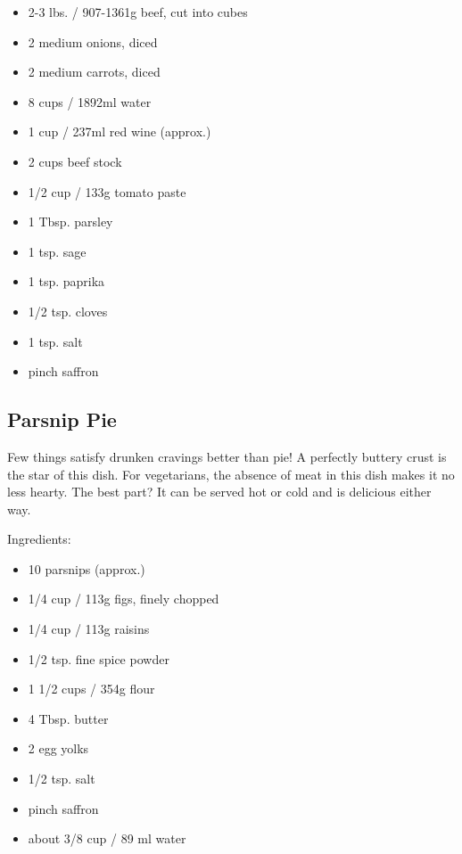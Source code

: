 \documentclass[10pt,a4paper,twoside,twocolumn,openany,bg=print,nodeprecatedcode]{dndbook}
\begin{document}
\begin{itemize}
\paragraph{Ingredients:}
\item 2-3 lbs. / 907-1361g beef, cut into cubes
\item 2 medium onions, diced
\item 2 medium carrots, diced
\item 8 cups / 1892ml water
\item 1 cup / 237ml red wine (approx.)
\item 2 cups beef stock
\item 1/2 cup / 133g tomato paste
\item 1 Tbsp. parsley
\item 1 tsp. sage
\item 1 tsp. paprika
\item 1/2 tsp. cloves
\item 1 tsp. salt
\item pinch saffron
\end{itemize}

\subsection{Parsnip Pie}
Few things satisfy drunken cravings better than pie! A perfectly buttery crust is the star of this dish. For vegetarians, the absence of meat in this dish makes it no less hearty. The best part? It can be served hot or cold and is delicious either way.

Ingredients:

\begin{itemize}
\paragraph{For the filling:}
\item 10 parsnips (approx.)
\item 1/4 cup / 113g figs, finely chopped
\item 1/4 cup / 113g raisins
\item 1/2 tsp. fine spice powder
\end{itemize}


\begin{itemize}
\paragraph{For the pie crust:}
\item 1 1/2 cups / 354g flour
\item 4 Tbsp. butter
\item 2 egg yolks
\item 1/2 tsp. salt
\item pinch saffron
\item about 3/8 cup / 89 ml water
\end{itemize}
\end{document}
